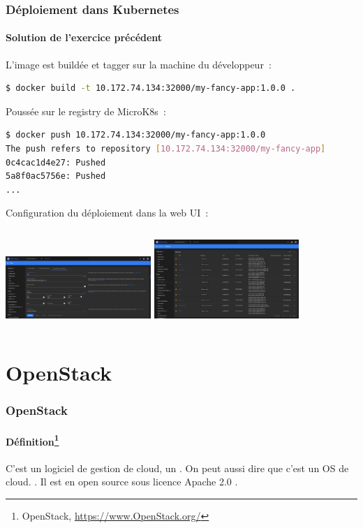 \documentclass{beamer}
\begin{document}
    \begin{frame}[fragile]
        \transdissolve
        \frametitle{Déploiement dans Kubernetes}
        \framesubtitle{Solution de l'exercice précédent}
        L'image est buildée et tagger sur la machine du développeur~:
        \begin{lstlisting}[language=bash]
$ docker build -t 10.172.74.134:32000/my-fancy-app:1.0.0 .
        \end{lstlisting}
        Poussée sur le registry de MicroK8s~:
        \begin{lstlisting}[language=bash]
$ docker push 10.172.74.134:32000/my-fancy-app:1.0.0
The push refers to repository [10.172.74.134:32000/my-fancy-app]
0c4cac1d4e27: Pushed
5a8f0ac5756e: Pushed
...
        \end{lstlisting}
        Configuration du déploiement dans la web UI~:
        \begin{columns}
            \centering
            \includegraphics[width=5.5cm]{image/k8s-deployment-configuration}
            \centering
            \includegraphics[width=5.5cm]{image/k8s-services}
        \end{columns}
    \end{frame}


    \section{OpenStack}\label{sec:openstack}

    \begin{frame}
        \transdissolve
        \frametitle{OpenStack}
        \framesubtitle{Définition\footnote{\label{OpenStackhome}OpenStack, \url{https://www.OpenStack.org/}}}
        C'est un logiciel de gestion de cloud, un .
        On peut aussi dire que c'est un OS de cloud.
        \bigbreak
        \bigbreak
        .
        \bigbreak
        \bigbreak
        Il est en open source sous licence Apache 2.0 .
    \end{frame}
\end{document}
